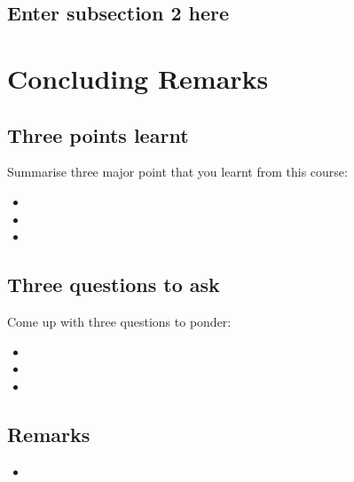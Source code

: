 \documentclass[
]{book}
\providecommand{\tightlist}{%
  \setlength{\itemsep}{0pt}\setlength{\parskip}{0pt}}
\begin{document}
\hypertarget{enter-subsection-2-here-11}{%
\section{Enter subsection 2 here}\label{enter-subsection-2-here-11}}

\hypertarget{concluding-remarks}{%
\chapter*{Concluding Remarks}\label{concluding-remarks}}

\hypertarget{three-points-learnt}{%
\section*{Three points learnt}\label{three-points-learnt}}

Summarise three major point that you learnt from this course:

\begin{itemize}
\tightlist
\item
\item
\item
\end{itemize}

\hypertarget{three-questions-to-ask}{%
\section*{Three questions to ask}\label{three-questions-to-ask}}

Come up with three questions to ponder:

\begin{itemize}
\tightlist
\item
\item
\item
\end{itemize}

\hypertarget{remarks}{%
\section*{Remarks}\label{remarks}}

\begin{itemize}
\tightlist
\item
\end{itemize}
\end{document}
